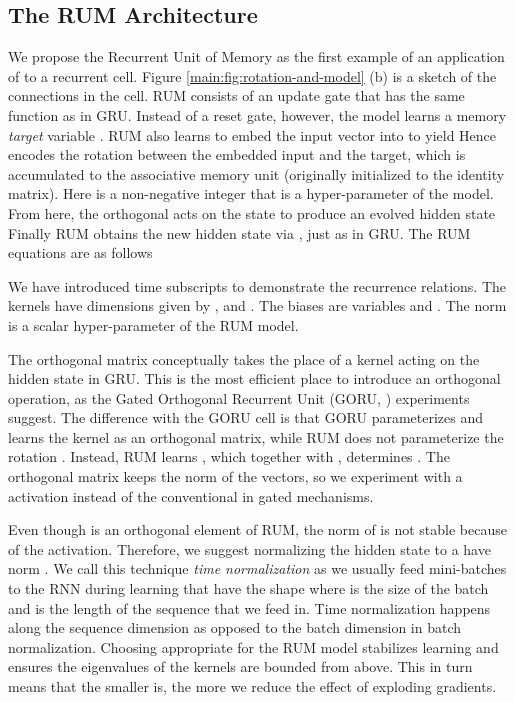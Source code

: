 \documentclass{article} \usepackage{iclr2018_conference,times}
\begin{document}
\subsection{The RUM Architecture}

We propose the Recurrent Unit of Memory as the first example of an application of  to a recurrent cell. Figure \ref{main:fig:rotation-and-model} (b) is a sketch of the connections in the cell. RUM consists of an update gate  that has the same function as in GRU. Instead of a reset gate, however, the model learns a memory \textit{target} variable . RUM also learns to embed the input vector  into  to yield  Hence  encodes the rotation between the embedded input and the target, which is accumulated to the associative memory unit  (originally initialized to the identity matrix). Here  is a non-negative integer that is a hyper-parameter of the model. From here, the orthogonal  acts on the state  to produce an evolved hidden state  Finally RUM obtains the new hidden state via , just as in GRU. The RUM equations are as follows

We have introduced time subscripts to demonstrate the recurrence relations. The kernels have dimensions given by ,  and .
The biases are variables  and . The norm  is a scalar hyper-parameter of the RUM model. 

The orthogonal matrix  conceptually takes the place of a kernel acting on the hidden state in GRU. This is the most efficient place to introduce an orthogonal operation, as the Gated Orthogonal Recurrent Unit (GORU, \cite{jing2017gated}) experiments suggest. The difference with the GORU cell is that GORU parameterizes and learns the kernel as an orthogonal matrix, while RUM does not parameterize the rotation . Instead, RUM learns , which together with ,  determines .
The orthogonal matrix keeps the norm of the vectors, so we experiment with a  activation instead of the conventional  in gated mechanisms. 

Even though  is an orthogonal element of RUM, the norm of  is not stable because of the  activation. Therefore, we suggest normalizing the hidden state  to a have norm . We call this technique \textit{time normalization} as we usually feed mini-batches to the RNN during learning that have the shape  where  is the size of the batch and  is the length of the sequence that we feed in. Time normalization happens along the  sequence dimension as opposed to the batch dimension in batch normalization. Choosing appropriate  for the RUM model stabilizes learning and ensures the eigenvalues of the kernels are bounded from above. This in turn means that the smaller  is, the more we reduce the effect of exploding gradients. 
\end{document}
